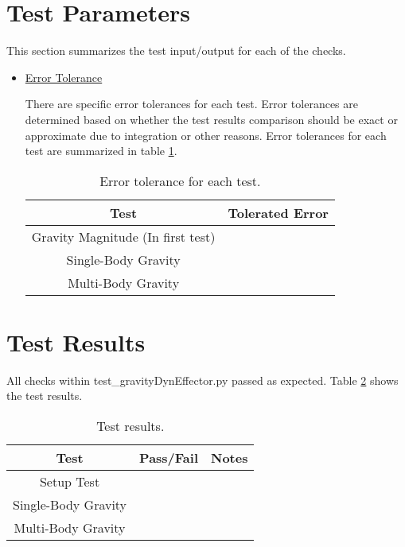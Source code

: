 \documentclass[]{BasiliskReportMemo}
\begin{document}
\section{Test Parameters}

This section summarizes the test input/output for each of the checks. 
\begin{itemize}
\item \underline{Error Tolerance}

There are specific error tolerances for each test. Error tolerances are determined based on whether the test results comparison should be exact or approximate due to integration or other reasons. Error tolerances for each test are summarized in table \ref{tab:errortol}. 

\begin{table}[htbp]
	\caption{Error tolerance for each test.}
	\label{tab:errortol}
	\centering \fontsize{10}{10}\selectfont
	\begin{tabular}{ c | c } %
		\hline
		\textbf{Test}   							& \textbf{Tolerated Error} 						  \\ \hline
		Gravity Magnitude (In first test) & 		   \\ \hline
		Single-Body Gravity						& 														   \\ \hline
		Multi-Body Gravity 						& 	 		       \\ \hline
	\end{tabular}
\end{table}
\end{itemize}

\section{Test Results}

All checks within test\_gravityDynEffector.py passed as expected. Table \ref{tab:results} shows the test results.

\begin{table}[htbp]
	\caption{Test results.}
	\label{tab:results}
	\centering \fontsize{10}{10}\selectfont
	\begin{tabular}{c | c | c  } %
		\hline
		\textbf{Test} 				    & \textbf{Pass/Fail} 						   			           & \textbf{Notes} 									\\ \hline
		Setup Test 		   			  	&      & 			 \\ \hline
		Single-Body Gravity		   	&                  &  \\ \hline
		Multi-Body Gravity			 &  			 	 &   			   \\ \hline
	\end{tabular}
\end{table}
\end{document}
